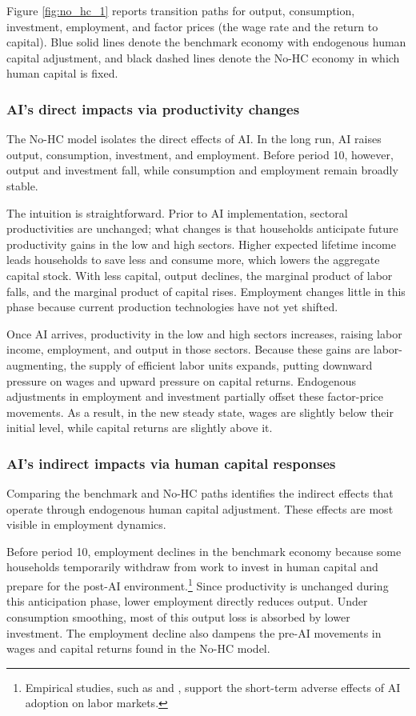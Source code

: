 \documentclass[12pt,english]{article}
\numberwithin{equation}{section}
\begin{document}
Figure \ref{fig:no_hc_1} reports transition paths for output, consumption, investment, employment, and factor prices (the wage rate and the return to capital). Blue solid lines denote the benchmark economy with endogenous human capital adjustment, and black dashed lines denote the No-HC economy in which human capital is fixed.

\subsubsection{AI's direct impacts via productivity changes}

The No-HC model isolates the direct effects of AI. In the long run, AI raises output, consumption, investment, and employment. Before period 10, however, output and investment fall, while consumption and employment remain broadly stable.

The intuition is straightforward. Prior to AI implementation, sectoral productivities are unchanged; what changes is that households anticipate future productivity gains in the low and high sectors. Higher expected lifetime income leads households to save less and consume more, which lowers the aggregate capital stock. With less capital, output declines, the marginal product of labor falls, and the marginal product of capital rises. Employment changes little in this phase because current production technologies have not yet shifted.

Once AI arrives, productivity in the low and high sectors increases, raising labor income, employment, and output in those sectors. Because these gains are labor-augmenting, the supply of efficient labor units expands, putting downward pressure on wages and upward pressure on capital returns. Endogenous adjustments in employment and investment partially offset these factor-price movements. As a result, in the new steady state, wages are slightly below their initial level, while capital returns are slightly above it.

\subsubsection{AI's indirect impacts via human capital responses}

Comparing the benchmark and No-HC paths identifies the indirect effects that operate through endogenous human capital adjustment. These effects are most visible in employment dynamics.

Before period 10, employment declines in the benchmark economy because some households temporarily withdraw from work to invest in human capital and prepare for the post-AI environment.\footnote{Empirical studies, such as \citet{Lerch2021} and \citet{Faber2022}, support the short-term adverse effects of AI adoption on labor markets.} Since productivity is unchanged during this anticipation phase, lower employment directly reduces output. Under consumption smoothing, most of this output loss is absorbed by lower investment. The employment decline also dampens the pre-AI movements in wages and capital returns found in the No-HC model.
\end{document}
